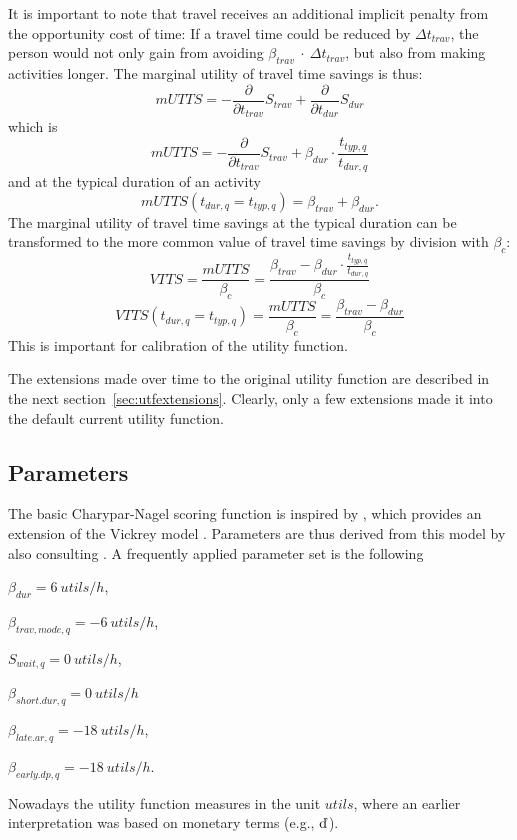It is important to note that travel receives an additional implicit penalty from the opportunity cost of time: If a travel time could be reduced by $\Delta t_{trav}$, the person would not only gain from avoiding $\beta_{trav}~\cdot~\Delta t_{trav}$, but also from making activities longer. The marginal utility of travel time savings is thus:
%
\[
mUTTS = - \frac{\partial}{\partial t_{trav}} S_{trav} + \frac{\partial}{\partial t_{dur}}S_{dur} 
\]
which is 
\begin{equation}
mUTTS = - \frac{\partial}{\partial t_{trav}} S_{trav} +  \beta_{dur} \cdot \frac{t_{typ,q}}{t_{dur,q}} 
\label{eq:mUTTSfull}
\end{equation}
and at the typical duration of an activity
\[
mUTTS(t_{dur,q} = t_{typ,q}) = \beta_{trav} + \beta_{dur}.
\]
The marginal utility of travel time savings at the typical duration can be transformed to the more common value of travel time savings by division with $\beta_{c}$:
\[
VTTS = \frac{mUTTS}{\beta_{c}} = \frac{\beta_{trav} - \beta_{dur} \cdot \frac{t_{typ,q}}{t_{dur,q}} }{\beta_{c}}
\]
\[
VTTS(t_{dur,q} = t_{typ,q}) = \frac{mUTTS}{\beta_{c}} = \frac{\beta_{trav} - \beta_{dur}}{\beta_{c}}
\]
This is important for calibration of the utility function.

The extensions made over time to the original utility function are described in the next section~\ref{sec:utfextensions}. Clearly, only a few extensions made it into the default current utility function. 

\subsection{Parameters}
\label{sec:paramset}
The basic Charypar-Nagel scoring function is inspired by \citet[][]{ArnottEtAl_TAER_1993}, which provides an extension of the Vickrey model \citep[][]{Vickrey_TAER_1969}. Parameters are thus derived from this model by also consulting \citet[][]{ChaumetEtAl_2006}. A frequently applied parameter set is the following 
%
\begin{compactitem}
\item $\beta_{dur}= 6\ utils/h$,
\item $\beta_{trav, mode, q}= -6\ utils/h$,
\item $S_{wait,q}=0\ utils/h$,
\item $\beta_{short.dur,q} = 0\ utils/h$
\item $\beta_{late.ar,q}=-18\ utils/h$,
\item $\beta_{early.dp,q}=-18\ utils/h$.
\end{compactitem}
%
Nowadays the utility function measures in the unit $utils$, where an earlier interpretation was based on monetary terms (e.g., $\EUR$).

